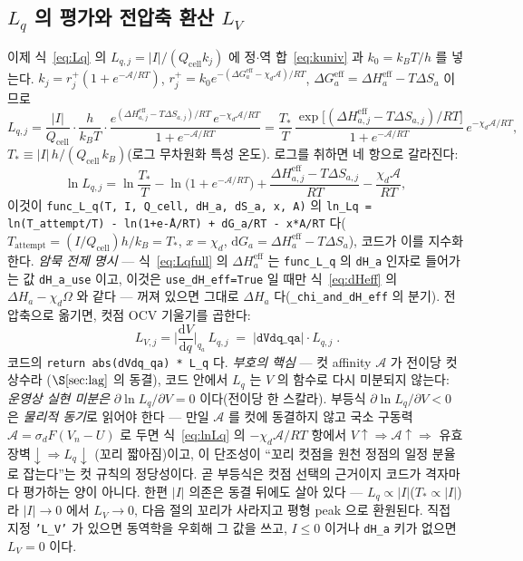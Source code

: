 \documentclass[11pt,a4paper]{article}
\newcommand{\dd}{\mathrm{d}}
\newcommand{\eff}{\mathrm{eff}}
\newcommand{\cell}{\mathrm{cell}}
\newcommand{\code}[1]{\texttt{#1}}
\begin{document}
\subsection{$L_q$ 의 평가와 전압축 환산 $L_V$}
이제 식~\eqref{eq:Lq} 의 $L_{q,j}=|I|/(Q_\cell k_j)$ 에 정$\cdot$역 합~\eqref{eq:kuniv} 과 $k_0=k_BT/h$ 를 넣는다.
$k_j=r_j^+(1+e^{-\mathcal A/RT})$, $r_j^+=k_0 e^{-(\Delta G_a^\eff-\chi_d\mathcal A)/RT}$, $\Delta G_a^\eff=\Delta H_a^\eff-T\Delta S_a$ 이므로
\begin{equation}
L_{q,j}=\frac{|I|}{Q_\cell}\cdot\frac{h}{k_BT}\cdot
\frac{e^{(\Delta H_{a,j}^\eff-T\Delta S_{a,j})/RT}\,e^{-\chi_d\mathcal A/RT}}{1+e^{-\mathcal A/RT}}
=\frac{T_*}{T}\,\frac{\exp\!\big[(\Delta H_{a,j}^\eff-T\Delta S_{a,j})/RT\big]}{1+e^{-\mathcal A/RT}}
\,e^{-\chi_d\mathcal A/RT},
\label{eq:Lqfull}
\end{equation}
$T_*\equiv|I|\,h/(Q_\cell\,k_B)$(로그 무차원화 특성 온도). 로그를 취하면 네 항으로 갈라진다:
\begin{equation}
\ln L_{q,j}=\ln\frac{T_*}{T}-\ln\!\big(1+e^{-\mathcal A/RT}\big)
+\frac{\Delta H_{a,j}^\eff-T\Delta S_{a,j}}{RT}-\frac{\chi_d\mathcal A}{RT},
\label{eq:lnLq}
\end{equation}
이것이 \code{func\_L\_q(T, I, Q\_cell, dH\_a, dS\_a, x, A)} 의
\code{ln\_Lq = ln(T\_attempt/T) - ln(1+e\^{-A/RT}) + dG\_a/RT - x*A/RT} 다($T_\mathrm{attempt}=(I/Q_\cell)h/k_B=T_*$,
$x=\chi_d$, $\dd G_a=\Delta H_a^\eff-T\Delta S_a$), 코드가 이를 지수화한다. \emph{암묵 전제 명시} — 식~\eqref{eq:Lqfull} 의
$\Delta H_a^\eff$ 는 \code{func\_L\_q} 의 \code{dH\_a} 인자로 들어가는 값 \code{dH\_a\_use} 이고, 이것은
\code{use\_dH\_eff=True} 일 때만 식~\eqref{eq:dHeff} 의 $\Delta H_a-\chi_d\Omega$ 와 같다 — 꺼져 있으면 그대로
$\Delta H_a$ 다(\code{\_chi\_and\_dH\_eff} 의 분기). 전압축으로 옮기면, 컷점 OCV 기울기를 곱한다:
\begin{equation}
\boxed{\;L_{V,j}=\Big|\frac{\dd V}{\dd q}\Big|_{q_a}\,L_{q,j}\;=\;|\code{dVdq\_qa}|\cdot L_{q,j}\;.}
\label{eq:LV}
\end{equation}
코드의 \code{return abs(dVdq\_qa) * L\_q} 다. \emph{부호의 핵심} — 컷 affinity $\mathcal A$ 가 전이당 컷 상수라
($\S\ref{sec:lag}$ 의 동결), 코드 안에서 $L_q$ 는 $V$ 의 함수로 다시 미분되지 않는다: \emph{운영상 실현 미분은}
$\partial\ln L_q/\partial V=0$ 이다(전이당 한 스칼라). 부등식 $\partial\ln L_q/\partial V<0$ 은 \emph{물리적 동기}로 읽어야
한다 — 만일 $\mathcal A$ 를 컷에 동결하지 않고 국소 구동력 $\mathcal A=\sigma_dF(V_n-U)$ 로 두면 식~\eqref{eq:lnLq} 의
$-\chi_d\mathcal A/RT$ 항에서 $V\!\uparrow\Rightarrow\mathcal A\!\uparrow\Rightarrow$ 유효 장벽$\downarrow\Rightarrow L_q\downarrow$
(꼬리 짧아짐)이고, 이 단조성이 ``꼬리 컷점을 원천 정점의 일정 분율로 잡는다''는 컷 규칙의 정당성이다. 곧 부등식은
컷점 선택의 근거이지 코드가 격자마다 평가하는 양이 아니다. 한편 $|I|$ 의존은 동결 뒤에도 살아 있다 —
$L_q\propto|I|$($T_*\propto|I|$)라 $|I|\to0$ 에서 $L_V\to0$, 다음 절의 꼬리가 사라지고 평형 peak 으로 환원된다.
직접 지정 \code{'L\_V'} 가 있으면 동역학을 우회해 그 값을 쓰고, $I\le0$ 이거나 \code{dH\_a} 키가 없으면 $L_V=0$ 이다.
\end{document}
